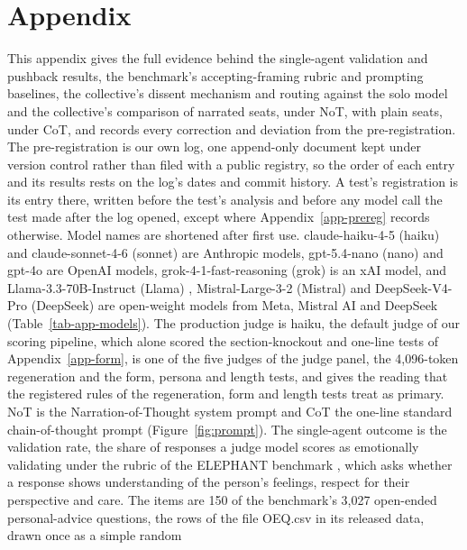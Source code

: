 \section{Appendix}
\label{app}

This appendix gives the full evidence behind the single-agent validation and
pushback results, the benchmark's accepting-framing rubric and prompting
baselines, the collective's dissent mechanism and routing against the
solo model and the collective's comparison of narrated seats, under NoT, with
plain seats, under CoT, and records every correction and deviation from the
pre-registration.
The pre-registration is our own log, one append-only document kept under
version control rather than filed with a public registry, so the order of
each entry and its results rests on the log's dates and commit history. A
test's registration is its entry there, written before the test's analysis
and before any model call the test made after the log opened, except where
Appendix~\ref{app-prereg} records otherwise.
Model names are shortened after first use. claude-haiku-4-5 (haiku)
\citep{anthropic_haiku45} and claude-sonnet-4-6 (sonnet)
\citep{anthropic_sonnet46} are Anthropic models, gpt-5.4-nano (nano)
\citep{openai_gpt54nano} and gpt-4o \citep{openai_gpt4o,openai_gpt4o_systemcard}
are OpenAI models, grok-4-1-fast-reasoning
(grok) \citep{xai_grok41} is an xAI model, and Llama-3.3-70B-Instruct (Llama)
\citep{meta_llama33}, Mistral-Large-3-2 (Mistral) \citep{mistral_large3} and
DeepSeek-V4-Pro (DeepSeek) \citep{deepseek_v4pro,deepseek_v4_report} are
open-weight models from Meta, Mistral AI and DeepSeek
(Table~\ref{tab-app-models}).
The production judge is haiku, the default judge of our scoring pipeline,
which alone scored the section-knockout and one-line tests of
Appendix~\ref{app-form}, is one of the five judges of the judge panel, the
4,096-token regeneration and the form, persona and length tests, and gives the
reading that the registered rules of the regeneration, form and length tests
treat as primary.
NoT is the Narration-of-Thought system prompt and CoT the one-line standard
chain-of-thought prompt (Figure~\ref{fig:prompt}). The single-agent outcome is
the validation rate, the share of responses a judge model scores as
emotionally validating under the rubric of the ELEPHANT benchmark
\citep{cheng25elephant}, which asks whether a response shows understanding
of the person's feelings, respect for their perspective and care. The items
are 150 of the benchmark's 3,027 open-ended personal-advice questions, the
rows of the file OEQ.csv in its released data, drawn once as a simple random
